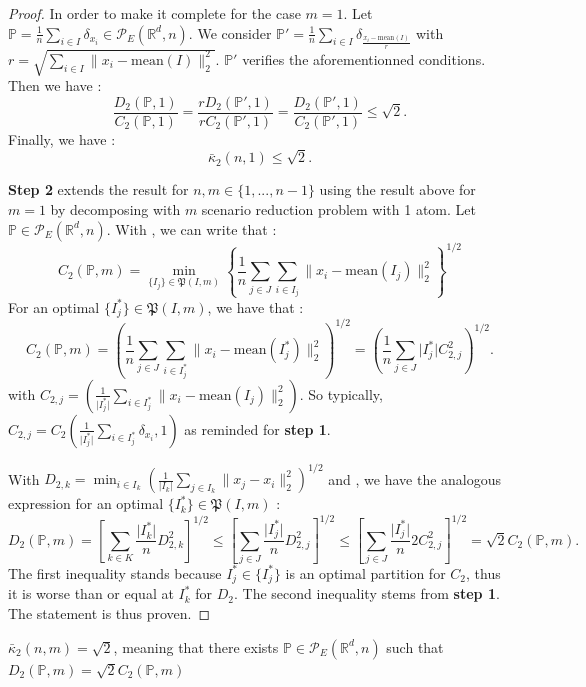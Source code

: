 \documentclass{amsart}
\newcommand{\RR}{\mathbb{R}}
\begin{document}
\begin{proof}
In order to make it complete for the case $m=1$. Let $\mathbb{P}=\frac{1}{n}\sum_{i\in I}\delta_{x_i}\in\mathcal{P}_E\left(\RR^d,n\right)$. We consider $\mathbb{P}'=\frac{1}{n}\sum_{i\in I}\delta_{\frac{x_i-\text{mean}(I)}{r}}$ with $r=\sqrt{\sum_{i\in I}\rVert x_i-\text{mean}(I)\lVert^2_2}$. $\mathbb{P}'$ verifies the aforementionned conditions. Then we have : 
$$
\frac{D_2\left(\mathbb{P},1\right)}{C_2\left(\mathbb{P},1\right)}=\frac{rD_2\left(\mathbb{P}',1\right)}{rC_2\left(\mathbb{P}',1\right)}=\frac{D_2\left(\mathbb{P}',1\right)}{C_2\left(\mathbb{P}',1\right)}\leq \sqrt{2}.
$$
Finally, we have : $$\bar\kappa_2\left(n,1\right)\leq\sqrt{2}.$$
\newline

\textbf{Step 2} extends the result for $n,m\in\{1,...,n-1\}$ using the result above for $m=1$ by decomposing with $m$ scenario reduction problem with 1 atom. Let $\mathbb{P}\in\mathcal{P}_E\left(\RR^d,n\right). $ With , we can write that :
$$
C_2\left(\mathbb{P},m\right)=\min_{\{I_j\}\in \mathfrak{P}(I,m)}\left\{ \frac{1}{n}\sum_{j\in J}\sum_{i\in I_j}\lVert x_i-\text{mean}\left(I_j\right)\rVert^2_2 \right\}^{1/2}
$$
For an optimal $\{I_j^*\}\in\mathfrak{P}\left(I,m\right)$, we have that :
$$
C_2\left(\mathbb{P},m\right)=\left(\frac{1}{n}\sum_{j\in J}\sum_{i\in I_j^*} \lVert x_i-\text{mean}\left(I_j^*\right)\rVert^2_2\right)^{1/2}=\left(\frac{1}{n}\sum_{j\in J}\lvert I_j^*\rvert C^2_{2,j}\right)^{1/2}.
$$
with $C_{2,j}=\left(\frac{1}{\lvert I_j^*\rvert}\sum_{i\in I_j^*}\lVert x_i -\text{mean}\left(I_j\right)\rVert^2_2\right)$. So typically,  $C_{2,j}=C_2\left(\frac{1}{\lvert I_j^*\rvert}\sum_{i\in I_j^*}\delta_{x_i},1\right)$ as reminded for \textbf{step 1}.

With $D_{2,k}=\min_{i\in I_k}\left(\frac{1}{\lvert I_k\rvert}\sum_{j\in I_k}\lVert x_j -x_i\rVert^2_2\right)^{1/2}$ and , we have the analogous expression for an optimal $\{I_k^*\}\in\mathfrak{P}\left(I,m\right)$ : 
$$
D_2\left(\mathbb{P},m\right)=\left[ \sum_{k\in K}\frac{\lvert I_k^*\rvert}{n}D_{2,k}^2\right]^{1/2}\leq \left[ \sum_{j\in J}\frac{\lvert I_j^*\rvert}{n}D_{2,j}^2\right]^{1/2}\leq \left[ \sum_{j\in J}\frac{\lvert I_j^*\rvert}{n}2C_{2,j}^2\right]^{1/2}=\sqrt{2}C_2\left(\mathbb{P},m\right).
$$
The first inequality stands because $I_j^*\in\{I_j^*\}$ is an optimal partition for $C_2$, thus it is worse than or equal at $I_k^*$ for $D_2$. The second inequality stems from \textbf{step 1}. The statement is thus proven.
\end{proof}
\begin{proposition}
    $\bar\kappa_2\left(n,m\right)=\sqrt{2}$, meaning that there exists $\mathbb{P}\in\mathcal{P}_E\left(\RR^d,n\right)$ such that $D_2\left(\mathbb{P},m\right)=\sqrt{2}C_2\left(\mathbb{P},m\right)$
\end{proposition}
\end{document}
